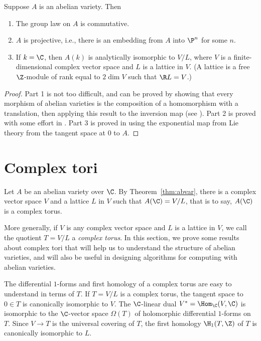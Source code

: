 \documentclass{report}
\begin{document}
\begin{theorem}\label{thm:abvar}
Suppose $A$ is an abelian variety.  Then
\begin{enumerate}
\item The group law on $A$ is commutative. \item $A$ is
projective, i.e., there is an embedding from $A$ into $\P^n$ for
some $n$. \item If $k=\C$, then $A(k)$ is analytically isomorphic
to $V/L$, where $V$ is a finite-dimensional complex vector space
and $L$ is a lattice in $V$. (A lattice is a free $\Z$-module of
rank equal to $2\dim V$ such that $\R L=V$.)
\end{enumerate}
\end{theorem}
\begin{proof}
Part 1  is not too difficult, and can be proved by showing that
every morphism  of abelian varieties is the composition of a
homomorphism with a translation, then applying this result to the
inversion map (see \cite[Cor.~2.4]{milne:abvars}).   Part 2 is
proved with some effort in \cite[\S7]{milne:abvars}.  Part 3 is
proved in \cite[\S I.1]{mumford:abvars} using the exponential map
from Lie theory from the tangent space at $0$ to $A$.
\end{proof}

\section{Complex tori}
Let $A$ be an abelian variety over $\C$.   By
Theorem~\ref{thm:abvar}, there is a complex vector space  $V$ and
a lattice $L$ in $V$ such that $A(\C)=V/L$, that is to say,
$A(\C)$ is a complex torus.

More generally, if $V$ is any complex  vector space and $L$ is a
lattice in $V$, we call the quotient $T=V/L$ a {\em complex
torus}.  In this section, we prove some results about complex tori
that will help us to understand the structure of abelian
varieties, and will also be useful in designing algorithms for
computing with abelian varieties.

The differential $1$-forms and first homology of a complex torus
are easy to understand in terms of $T$.  If $T=V/L$ is a complex
torus, the tangent space to $0\in T$ is canonically isomorphic to
$V$. The $\C$-linear dual $V^*=\Hom_\C(V,\C)$ is isomorphic to the
$\C$-vector space $\Omega(T)$ of holomorphic differential
$1$-forms on $T$. Since $V\to T$ is the universal covering of $T$,
the first homology $\H_1(T,\Z)$ of $T$ is canonically isomorphic
to $L$.
\end{document}
